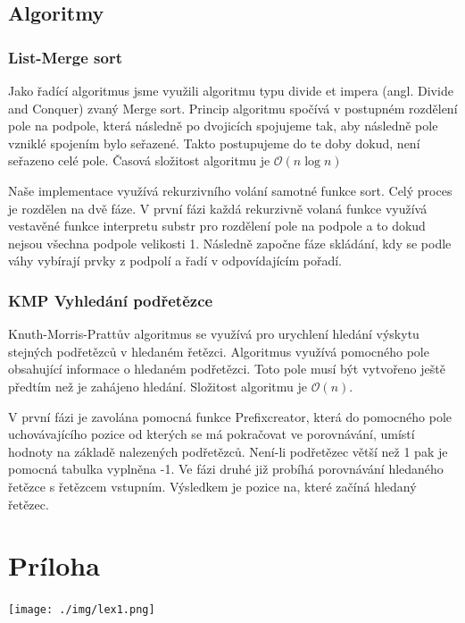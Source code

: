 \documentclass[12pt,a4paper]{report}
\begin{document}
\section{Algoritmy}
\subsection{List-Merge sort}
\par Jako řadící algoritmus jsme využili algoritmu typu divide et impera (angl. Divide and Conquer) zvaný Merge sort. Princip algoritmu spočívá v postupném rozdělení pole na podpole, která následně po dvojicích spojujeme tak, aby následně pole vzniklé spojením bylo seřazené. Takto postupujeme do te doby dokud, není seřazeno celé pole. Časová složitost algoritmu je $\mathcal{O}(n\log{}n)$
\par Naše implementace využívá rekurzivního volání samotné funkce sort. Celý proces je rozdělen na dvě fáze. V první fázi každá rekurzivně volaná funkce využívá vestavěné funkce interpretu substr pro rozdělení pole na podpole a to dokud nejsou všechna podpole velikosti 1. Následně započne fáze skládání, kdy se podle váhy vybírají prvky z podpolí a řadí v odpovídajícím pořadí.

\subsection{KMP Vyhledání podřetězce}
\par Knuth-Morris-Prattův algoritmus se využívá pro urychlení hledání výskytu stejných podřetězců v hledaném řetězci. Algoritmus využívá pomocného pole obsahující informace o hledaném podřetězci. Toto pole musí být vytvořeno ještě předtím než je zahájeno hledání. Složitost algoritmu je $\mathcal{O}(n)$.
\par V první fázi je zavolána pomocná funkce Prefixcreator, která do pomocného pole uchovávajícího pozice od kterých se má pokračovat ve porovnávání, umístí hodnoty na základě nalezených podřetězců. Není-li podřetězec větší než 1 pak je pomocná tabulka vyplněna -1.
Ve fázi druhé již probíhá porovnávání hledaného řetězce s řetězcem vstupním. Výsledkem je pozice na, které začíná hledaný řetězec.

\chapter{Príloha}
\texttt{[image: ./img/lex1.png]}\\
\end{document}
